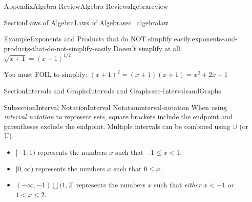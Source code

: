 \documentclass{tufte-book}
\numberwithin{equation}{chapter}
\begin{document}
\begin{appendixptx}{Appendix}{Algebra Review}{}{Algebra Review}{}{}{algebrareview}
\begin{sectionptx}{Section}{Laws of Algebra}{}{Laws of Algebra}{}{}{sec_algebralaw}
\begin{example}{Example}{Exponents and Products that do NOT simplify easily.}{exponents-and-products-that-do-not-simplify-easily}
Doesn't simplify at all: \(\sqrt{x+1} = (x+1)^{1/2}\)%
\par
You must FOIL to simplify: \((x+1)^2 = (x+1)(x+1) = x^2 + 2x + 1\)%
\end{example}
\end{sectionptx}
%
%
\typeout{************************************************}
\typeout{************************************************}
%
\begin{sectionptx}{Section}{Intervals and Graphs}{}{Intervals and Graphs}{}{}{sec-IntervalsandGraphs}
%
%
\typeout{************************************************}
\typeout{************************************************}
%
\begin{subsectionptx}{Subsection}{Interval Notation}{}{Interval Notation}{}{}{interval-notation}
When using \emph{interval notation} to represent sets, square brackets include the endpoint and parentheses exclude the endpoint. Multiple intervals can be combined using \(\cup\) (or U).%
\par
%
\begin{itemize}[label=\textbullet]
\item{}\([-1,1)\) represents the numbers \(x\) such that \(-1\leq x <1\).%
\begin{image}{0.25}{0.5}{0.25}{}%
%
\end{image}%
\item{}\([0,\infty)\) represents the numbers \(x\) such that \(0\leq x \).%
\begin{image}{0.25}{0.5}{0.25}{}%
%
\end{image}%
\item{}\((-\infty,-1)\bigcup (1,2]\) represents the numbers \(x\) such that \emph{either} \(x<-1\) \emph{or} \(1<x\leq 2\).%

\end{itemize}
\end{subsectionptx}
\end{sectionptx}
\end{appendixptx}
\end{document}

